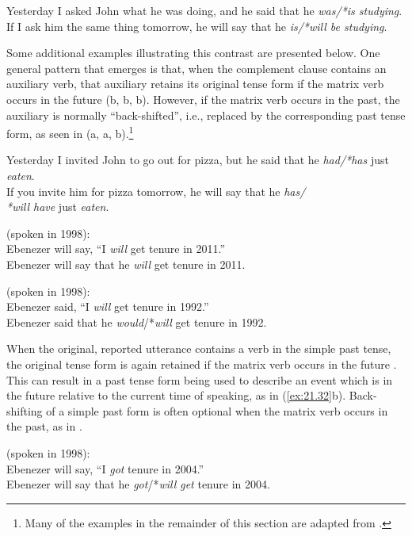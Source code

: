 \ea \label{ex:21.28}
\ea  Yesterday I asked John what he was doing, and he said that he \textit{was/*is studying}.\\
\ex If I ask him the same thing tomorrow, he will say that he \textit{is/*will be studying}.
                       \z
\z


Some additional examples illustrating this contrast are presented below. One general pattern that emerges is that, when the complement clause contains an auxiliary verb, that auxiliary retains its original tense form if the matrix verb occurs in the future (b, b, b). However, if the matrix verb occurs in the past, the auxiliary is normally “back-shifted”, i.e., replaced by the corresponding past tense form, as seen in (a, a, b).\footnote{Many of the examples in the remainder of this section are adapted from \citet{Declerck1991}.}


\ea \label{ex:21.29}
\ea  Yesterday I invited John to go out for pizza, but he said that he \textit{had/*has} just \textit{eaten}.\\
\ex If you invite him for pizza tomorrow, he will say that he \textit{has/\\*will have} just \textit{eaten}.
                       \z
\z


\ea \label{ex:21.30}
(spoken in 1998):\\
 Ebenezer will say, “I \textit{will} get tenure in 2011.”\\
 Ebenezer will say that he \textit{will} get tenure in 2011.
                       \z
\z

\ea \label{ex:21.31}
(spoken in 1998):\\
 Ebenezer said, “I \textit{will} get tenure in 1992.”\\
 Ebenezer said that he \textit{would}/*\textit{will} get tenure in 1992.
                       \z
\z


When the original, reported utterance contains a verb in the simple past tense, the original tense form is again retained if the matrix verb occurs in the future . This can result in a past tense form being used to describe an event which is in the future relative to the current time of speaking, as in (\ref{ex:21.32}b). Back-shifting of a simple past form is often optional when the matrix verb occurs in the past, as in .


\ea \label{ex:21.32}
(spoken in 1998):\\
 Ebenezer will say, “I \textit{got} tenure in 2004.”\\
 Ebenezer will say that he \textit{got}/*\textit{will get} tenure in 2004.
                       \z
\z

